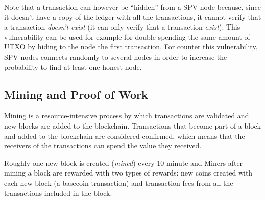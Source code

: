 Note that a transaction can however be ``hidden'' from a SPV node because, since
it doesn't have a copy of the ledger with all the transactions, it cannot verify
that a transaction \emph{doesn't exist} (it can only verify that a transaction
\emph{exist}). This vulnerability can be used for example for double spending
the same amount of UTXO by hiding to the node the first transaction. For counter
this vulnerability, SPV nodes connects randomly to several nodes in order to
increase the probability to find at least one honest node.











\subsection{Mining and Proof of Work} Mining is a resource-intensive
process by which transactions are validated and new blocks are added to the
blockchain. Transactions that become part of a block and added to the blockchain
are considered confirmed, which means that the receivers of the transactions can
spend the value they received.

Roughly one new block is created (\emph{mined}) every 10 minute and Miners after
mining a block are rewarded with two types of rewards: new coins created with
each new block (a basecoin transaction) and transaction fees from all the
transactions included in the block.

